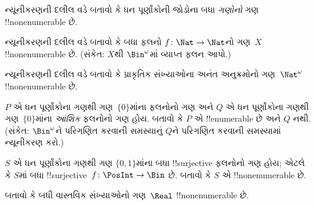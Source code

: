 \documentclass[../../../include/open-logic-section]{subfiles}
\begin{document}
\begin{prob}
ન્યૂનીકરણની દલીલ વડે બતાવો કે ધન પૂર્ણાંકોની જોડોના બધા
\emph{ગણોનો} ગણ !!{nonenumerable} છે.
\end{prob}

\begin{prob}\label{sfr:siz:red:prob:nat-nat}
  ન્યૂનીકરણની દલીલ વડે બતાવો કે બધા ફલનો
  $f\colon \Nat \to \Nat$નો ગણ~$X$ !!{nonenumerable} છે.
  (સંકેત: $X$થી $\Bin^\omega$માં વ્યાપ્ત ફલન આપો.)
\end{prob}

\begin{prob}
ન્યૂનીકરણની દલીલ વડે બતાવો કે પ્રાકૃતિક સંખ્યાઓના અનંત
અનુક્રમોનો ગણ~$\Nat^\omega$ !!{nonenumerable} છે.
\end{prob}

\begin{prob}
$P$ એ ધન પૂર્ણાંકોના ગણથી ગણ~$\{0\}$માંના ફલનોનો ગણ અને
$Q$ એ ધન પૂર્ણાંકોના ગણથી ગણ~$\{0\}$માંના \emph{આંશિક}
ફલનોનો ગણ હોય. બતાવો કે $P$ એ !!{enumerable} છે અને $Q$ નથી.
(સંકેત: $\Bin^\omega$ને પરિગણિત કરવાની સમસ્યાનું $Q$ને
પરિગણિત કરવાની સમસ્યામાં ન્યૂનીકરણ કરો.)
\end{prob}

\begin{prob}
$S$ એ ધન પૂર્ણાંકોના ગણથી ગણ $\{0,1\}$માંના બધા
!!{surjective} ફલનોનો ગણ હોય; એટલે કે $S$માં બધા
!!{surjective}~$f\colon \PosInt \to \Bin$ છે. બતાવો કે $S$ એ
!!{nonenumerable} છે.
\end{prob}

\begin{prob}
બતાવો કે બધી વાસ્તવિક સંખ્યાઓનો ગણ~$\Real$ !!{nonenumerable} છે.
\end{prob}
\end{document}
